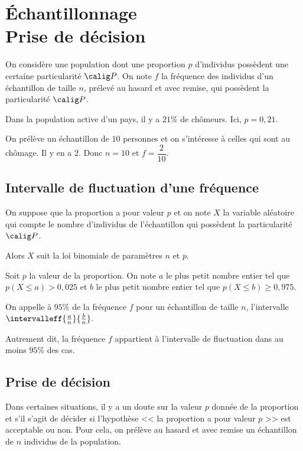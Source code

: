 \documentclass[10pt,openright,twoside,french]{book}
\begin{document}
\chapter[\'Echantillonnage et prise de décision]{\'Echantillonnage\\ Prise de décision}\label{echantillonnage}

On considère une population dont une proportion $p$ d'individus possèdent une certaine particularité $\calig P$. On note $f$ la fréquence des individus d'un échantillon de taille $n$, prélevé au hasard et avec remise, qui possèdent la particularité $\calig P$.\medskip

\begin{Exemple}
    Dans la population active d'un pays, il y a $21\%$ de chômeurs. Ici, $p = 0,21$.\par
    On prélève un échantillon de $10$ personnes et on s'intéresse à celles qui sont au chômage. Il y en a $2$. Donc $n = 10$ et $f = \dfrac{2}{10}$.
\end{Exemple}

\section{Intervalle de fluctuation d'une fréquence}

 On suppose que la proportion a pour valeur $p$ et on note $X$ la variable aléatoire qui compte le nombre d'individus de l'échantillon qui possèdent la particularité $\calig P$.\par
 Alors $X$ suit la loi binomiale de paramètres $n$ et $p$.
 
 \begin{Defi}
    Soit $p$ la valeur de la proportion. On note $a$ le plus petit nombre entier tel que $p(X \leq a) > 0,025$ et $b$ le plus petit nombre entier tel que $p(X \leq b) \geq 0,975$.\par
    On appelle  à $95\%$ de la fréquence $f$ pour un échantillon de taille $n$, l'intervalle $\intervalleff{\frac a n}{\frac b n}$.
 \end{Defi}
 
 Autrement dit, la fréquence $f$ appartient à l'intervalle de fluctuation dans au moins $95\%$ des cas.
 
 
 \section{Prise de décision}

Dans certaines situations, il y a un doute sur la valeur $p$ donnée de la proportion et s'il s'agit de décider si l'hypothèse << la proportion a pour valeur $p$ >> est acceptable ou non. Pour cela, on prélève au hasard et avec remise un échantillon de $n$ individus de la population.
\end{document}
